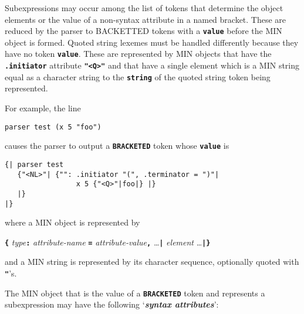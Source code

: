 \documentclass[12pt]{article}
\newcommand{\TT}[1]{{\tt \bfseries #1}}
\newcommand{\skey}[2]{{\bf \em #1#2}\index{#1}}
\newenvironment{indpar}[1][0.3in]%
	{\begin{list}{}%
		     {\setlength{\itemsep}{0in}%
		      \setlength{\topsep}{0in}%
		      \setlength{\parsep}{1ex}%
		      \setlength{\labelwidth}{#1}%
		      \setlength{\leftmargin}{#1}%
		      \addtolength{\leftmargin}{\labelsep}}%
	 \item}%
	{\end{list}}
\begin{document}
Subexpressions may occur among the list of tokens that determine the
object elements or the value of a non-syntax attribute in a named
bracket.  These are reduced by the parser to BACKETTED tokens
with a \TT{value} before the MIN object is formed.
Quoted string lexemes must be handled
differently because they have no token \TT{value}.  These are
represented by MIN objects
that have the \TT{.initiator} attribute \TT{"<Q>"}
and that have a single
element which is a MIN string equal as a character string to the
\TT{string} of the quoted string token being represented.

For example, the line
\begin{indpar}\begin{verbatim}
parser test (x 5 "foo")
\end{verbatim}\end{indpar}
causes the parser to output a \TT{BRACKETED} token whose \TT{value} is
\begin{indpar}\begin{verbatim}
{| parser test
   {"<NL>"| {"": .initiator "(", .terminator = ")"|
                 x 5 {"<Q>"|foo|} |}
   |}
|}
\end{verbatim}\end{indpar}
where a MIN object is represented by
\begin{center}
\TT{\{} {\em type}\TT{:}
        {\em attribute-name} \TT{=} {\em attribute-value}\TT{,} \ldots \TT{|}
	{\em element} \ldots \TT{|\}}
\end{center}

and a MIN string is represented by its character sequence, optionally
quoted with \TT{"}'s.

The MIN object that is the value of a \TT{BRACKETED} token and
represents a subexpression may have the following `\skey{syntax attribute}s':
\end{document}
